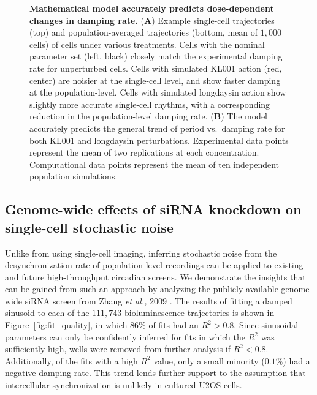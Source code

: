 \documentclass[11pt, letterpaper]{article}
\begin{document}
\begin{figure}[tbp]
  \begin{center}
  \end{center}
  \caption{{\bfseries Mathematical model accurately predicts dose-dependent changes in damping rate.}
({\bfseries A}) Example single-cell trajectories (top) and population-averaged trajectories (bottom, mean of $1,000$ cells) of cells under various treatments. Cells with the nominal parameter set (left, black) closely match the experimental damping rate for unperturbed cells. Cells with simulated KL001 action (red, center) are noisier at the single-cell level, and show faster damping at the population-level. Cells with simulated longdaysin action show slightly more accurate single-cell rhythms, with a corresponding reduction in the population-level damping rate.
({\bfseries B}) The model accurately predicts the general trend of period vs.\ damping rate for both KL001 and longdaysin perturbations. Experimental data points represent the mean of two replications at each concentration. Computational data points represent the mean of ten independent population simulations.}
\label{fig:simulation}
\end{figure}


\subsection*{Genome-wide effects of siRNA knockdown on single-cell stochastic noise}

Unlike from using single-cell imaging, inferring stochastic noise from the desynchronization rate of population-level recordings can be applied to existing and future high-throughput circadian screens.
We demonstrate the insights that can be gained from such an approach by analyzing the publicly available genome-wide siRNA screen from Zhang {\itshape et al.,} 2009 \cite{Zhang2009}.
The results of fitting a damped sinusoid to each of the $111,743$ bioluminescence trajectories is shown in Figure~\ref{fig:fit_quality}, in which $86\%$ of fits had an $R^2 > 0.8$.
Since sinusoidal parameters can only be confidently inferred for fits in which the $R^2$ was sufficiently high, wells were removed from further analysis if $R^2 < 0.8$.
Additionally, of the fits with a high $R^2$ value, only a small minority ($0.1\%$) had a negative damping rate. This trend lends further support to the assumption that intercellular synchronization is unlikely in cultured U2OS cells. 
\end{document}

